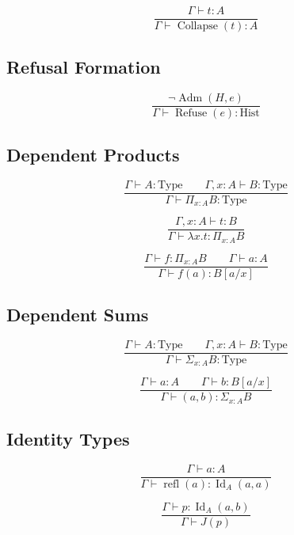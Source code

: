 \documentclass[12pt,oneside]{article}
\theoremstyle{definition}
\theoremstyle{remark}
\begin{document}
\[
\frac
{\Gamma\vdash
t:A}
{\Gamma\vdash
\operatorname{Collapse}(t):A}
\]

\subsection*{Refusal Formation}

\[
\frac
{\neg
\operatorname{Adm}(H,e)}
{\Gamma\vdash
\operatorname{Refuse}(e)
:
\mathrm{Hist}}
\]

\subsection*{Dependent Products}

\[
\frac
{\Gamma\vdash A:\mathrm{Type}
\qquad
\Gamma,x:A\vdash
B:\mathrm{Type}}
{\Gamma\vdash
\Pi_{x:A}B
:
\mathrm{Type}}
\]

\[
\frac
{\Gamma,x:A\vdash
t:B}
{\Gamma\vdash
\lambda x.t
:
\Pi_{x:A}B}
\]

\[
\frac
{\Gamma\vdash
f:\Pi_{x:A}B
\qquad
\Gamma\vdash
a:A}
{\Gamma\vdash
f(a)
:
B[a/x]}
\]

\subsection*{Dependent Sums}

\[
\frac
{\Gamma\vdash
A:\mathrm{Type}
\qquad
\Gamma,x:A\vdash
B:\mathrm{Type}}
{\Gamma\vdash
\Sigma_{x:A}B
:
\mathrm{Type}}
\]

\[
\frac
{\Gamma\vdash a:A
\qquad
\Gamma\vdash b:B[a/x]}
{\Gamma\vdash
(a,b)
:
\Sigma_{x:A}B}
\]

\subsection*{Identity Types}

\[
\frac
{\Gamma\vdash
a:A}
{\Gamma\vdash
\operatorname{refl}(a)
:
\operatorname{Id}_A(a,a)}
\]

\[
\frac
{\Gamma\vdash
p:
\operatorname{Id}_A(a,b)}
{\Gamma\vdash
J(p)}
\]
\end{document}
